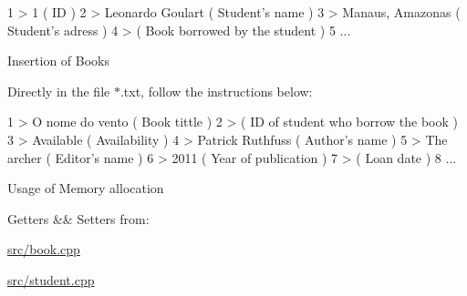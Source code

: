 \begin{DoxyCode}
1 > 1                 ( ID ) 
2 > Leonardo Goulart  ( Student's name )
3 > Manaus, Amazonas  ( Student's adress )
4 >                   ( Book borrowed by the student )
5 ...
\end{DoxyCode}



\begin{DoxyItemize}
\item Insertion of Books

Directly in the file $\ast$.txt, follow the instructions below\+:
\end{DoxyItemize}


\begin{DoxyCode}
1 > O nome do vento   ( Book tittle )
2 >                   ( ID of student who borrow the book )
3 > Available         ( Availability )
4 > Patrick Ruthfuss  ( Author's name )
5 > The archer        ( Editor's name )
6 > 2011              ( Year of publication )
7 >                   ( Loan date )
8 ... 
\end{DoxyCode}



\begin{DoxyItemize}
\item Usage of Memory allocation

Getters \&\& Setters from\+:

\hyperlink{book_8cpp}{src/book.\+cpp}

\hyperlink{student_8cpp}{src/student.\+cpp} 
\end{DoxyItemize}